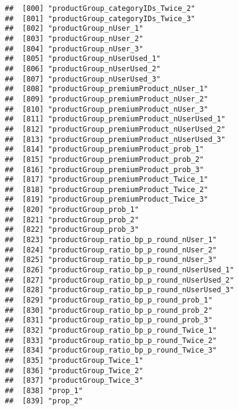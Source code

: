 \documentclass[10pt]{report}
\begin{document}
\begin{verbatim}
##  [800] "productGroup_categoryIDs_Twice_2"                     
##  [801] "productGroup_categoryIDs_Twice_3"                     
##  [802] "productGroup_nUser_1"                                 
##  [803] "productGroup_nUser_2"                                 
##  [804] "productGroup_nUser_3"                                 
##  [805] "productGroup_nUserUsed_1"                             
##  [806] "productGroup_nUserUsed_2"                             
##  [807] "productGroup_nUserUsed_3"                             
##  [808] "productGroup_premiumProduct_nUser_1"                  
##  [809] "productGroup_premiumProduct_nUser_2"                  
##  [810] "productGroup_premiumProduct_nUser_3"                  
##  [811] "productGroup_premiumProduct_nUserUsed_1"              
##  [812] "productGroup_premiumProduct_nUserUsed_2"              
##  [813] "productGroup_premiumProduct_nUserUsed_3"              
##  [814] "productGroup_premiumProduct_prob_1"                   
##  [815] "productGroup_premiumProduct_prob_2"                   
##  [816] "productGroup_premiumProduct_prob_3"                   
##  [817] "productGroup_premiumProduct_Twice_1"                  
##  [818] "productGroup_premiumProduct_Twice_2"                  
##  [819] "productGroup_premiumProduct_Twice_3"                  
##  [820] "productGroup_prob_1"                                  
##  [821] "productGroup_prob_2"                                  
##  [822] "productGroup_prob_3"                                  
##  [823] "productGroup_ratio_bp_p_round_nUser_1"                
##  [824] "productGroup_ratio_bp_p_round_nUser_2"                
##  [825] "productGroup_ratio_bp_p_round_nUser_3"                
##  [826] "productGroup_ratio_bp_p_round_nUserUsed_1"            
##  [827] "productGroup_ratio_bp_p_round_nUserUsed_2"            
##  [828] "productGroup_ratio_bp_p_round_nUserUsed_3"            
##  [829] "productGroup_ratio_bp_p_round_prob_1"                 
##  [830] "productGroup_ratio_bp_p_round_prob_2"                 
##  [831] "productGroup_ratio_bp_p_round_prob_3"                 
##  [832] "productGroup_ratio_bp_p_round_Twice_1"                
##  [833] "productGroup_ratio_bp_p_round_Twice_2"                
##  [834] "productGroup_ratio_bp_p_round_Twice_3"                
##  [835] "productGroup_Twice_1"                                 
##  [836] "productGroup_Twice_2"                                 
##  [837] "productGroup_Twice_3"                                 
##  [838] "prop_1"                                               
##  [839] "prop_2"                                               

\end{verbatim}
\end{document}
